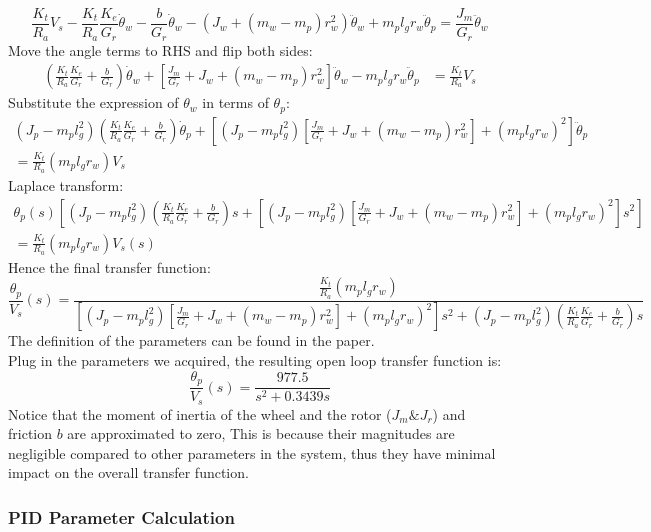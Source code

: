\documentclass{article}
\begin{document}
\[
\frac{K_t}{R_a} V_s - \frac{K_t}{R_a} \frac{K_e}{G_r} \dot{\theta}_w - \frac{b}{G_r} \dot{\theta}_w - (J_w + (m_w - m_p) r_w^2) \ddot{\theta}_w + m_p l_g r_w \ddot{\theta}_p = \frac{J_m}{G_r} \ddot{\theta}_w
\]
Move the angle terms to RHS and flip both sides:
\begin{align*}
\left( \frac{K_t}{R_a} \frac{K_e}{G_r} + \frac{b}{G_r} \right) \dot{\theta}_w + \left[ \frac{J_m}{G_r} + J_w + (m_w - m_p) r_w^2 \right] \ddot{\theta}_w - m_p l_g r_w \ddot{\theta}_p &= \frac{K_t}{R_a} V_s
\end{align*}
Substitute the expression of \(\theta_w\) in terms of \(\theta_p\):
\begin{align*}
(J_p - m_p l_g^2) \left( \frac{K_t}{R_a} \frac{K_e}{G_r} + \frac{b}{G_r} \right) \dot{\theta}_p + \left[ (J_p - m_p l_g^2) \left[ \frac{J_m}{G_r} + J_w + (m_w - m_p) r_w^2 \right] + (m_p l_g r_w)^2 \right] \ddot{\theta}_p \\= \frac{K_t}{R_a} (m_p l_g r_w) V_s
\end{align*}
Laplace transform:
\begin{multline*}
\theta_p(s) \left[ (J_p - m_p l_g^2) \left( \frac{K_t}{R_a} \frac{K_e}{G_r} + \frac{b}{G_r} \right) s + \left[ (J_p - m_p l_g^2) \left[ \frac{J_m}{G_r} + J_w + (m_w - m_p) r_w^2 \right] + (m_p l_g r_w)^2 \right] s^2 \right]
\\= \frac{K_t}{R_a} (m_p l_g r_w) V_s(s)
\end{multline*}
Hence the final transfer function:
\[
\frac{\theta_p}{V_s}(s) = \frac{\frac{K_t}{R_a} (m_p l_g r_w)}{\left[ (J_p - m_p l_g^2) \left[ \frac{J_m}{G_r} + J_w + (m_w - m_p) r_w^2 \right] + (m_p l_g r_w)^2 \right] s^2 + (J_p - m_p l_g^2) \left( \frac{K_t}{R_a} \frac{K_e}{G_r} + \frac{b}{G_r} \right) s}
\]
The definition of the parameters can be found in the paper. \\

Plug in the parameters we acquired, the resulting open loop transfer function is:
\[
\frac{\theta_p}{V_s}(s) = \frac{977.5}{s^2+0.3439s}
\]
Notice that the moment of inertia of the wheel and the rotor ($J_m \& J_r$) and
friction $b$ are approximated to zero, This is because their magnitudes are
negligible compared to other parameters in the system, thus they have
minimal impact on the overall transfer function.

\subsubsection{PID Parameter Calculation}
\end{document}
